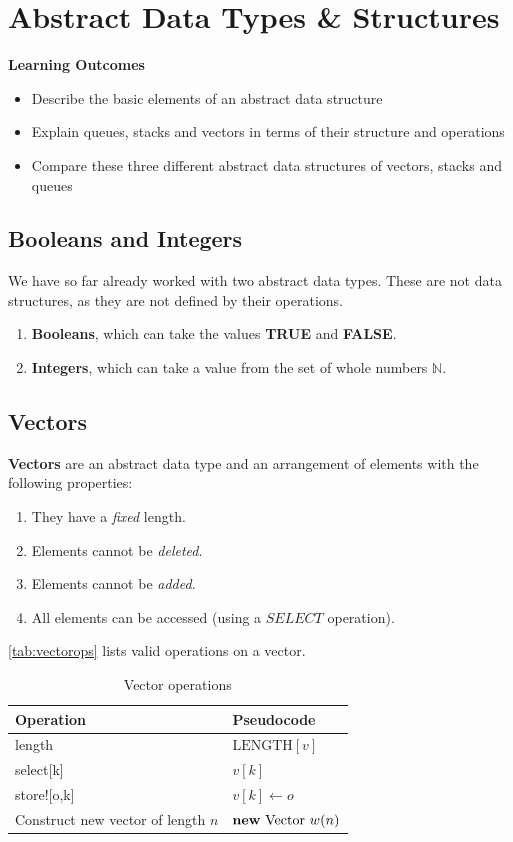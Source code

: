 \section{Abstract Data Types \& Structures}

\begin{mdframed}
	\textbf{Learning Outcomes}
	\begin{itemize}[label={\checkmark}]
		\item Describe the basic elements of an abstract data structure
		\item Explain queues, stacks and vectors in terms of their structure and operations
		\item Compare these three different abstract data structures of vectors, stacks and queues
	\end{itemize}
	\end{mdframed}

\subsection{Booleans and Integers}
We have so far already worked with two abstract data types. These are not data structures, as they are not defined by their operations.
\begin{enumerate}
	\item \textbf{Booleans}, which can take the values \textbf{TRUE} and \textbf{FALSE}.
	\item \textbf{Integers}, which can take a value from the set of whole numbers \( \mathbb{N} \).
\end{enumerate}

\subsection{Vectors}
\textbf{Vectors} are an abstract data type and an arrangement of elements with the following properties:

\begin{enumerate}
	\item They have a \emph{fixed} length.
	\item Elements cannot be \emph{deleted}.
	\item Elements cannot be \emph{added}.
	\item All elements can be accessed (using a \( SELECT \) operation).
	\end{enumerate}

	\autoref{tab:vectorops} lists valid operations on a vector.
\begin{table}[ht]
	\centering
	\begin{tabular}{@{}ll@{}}
	\toprule
		Operation & Pseudocode \\ \midrule
	length & \( \textrm{LENGTH}[v] \)  \\
	select[k] & \( v[k] \)  \\
	store![o,k] & \( v[k] \gets o \)  \\
	Construct new vector of length \( n \)  & \( \textrm{\textbf{new} Vector } w(n) \) \\ \bottomrule
	\end{tabular}
	\caption{Vector operations}\label{tab:vectorops}
	\end{table}

